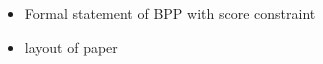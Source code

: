 \documentclass{llncs}
\begin{document}
\begin{itemize}
	\item Formal statement of BPP with score constraint
	
	\item layout of paper
\end{itemize}
\end{document}
